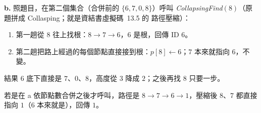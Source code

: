 \begin{pastsoln}
\textbf{b.} 照題目，在第二個集合（合併前的 $\{6, 7, 0, 8\}$）呼叫 \textit{CollapsingFind}$(8)$（原題拼成 Collasping；就是資結書虛擬碼~13.5 的
路徑壓縮）：
\begin{enumerate}
\item 第一趟從 $8$ 往上找根：$8 \to 7 \to 6$，$6$ 是根，回傳 ID $6$。
\item 第二趟把路上經過的每個節點直接接到根：$p[8] \gets 6$；$7$ 本來就指向 $6$，不變。
\end{enumerate}
結果 $6$ 底下直接是 $7$、$0$、$8$，高度從 $3$ 降成 $2$；之後再找 $8$ 只要一步。
\begin{center}
\end{center}
若是在 a 依節點數合併之後才呼叫，路徑是 $8 \to 7 \to 6 \to 1$，壓縮後 $8$、$7$ 都直接指向 $1$（$6$ 本來就是），回傳 $1$。
\end{pastsoln}
